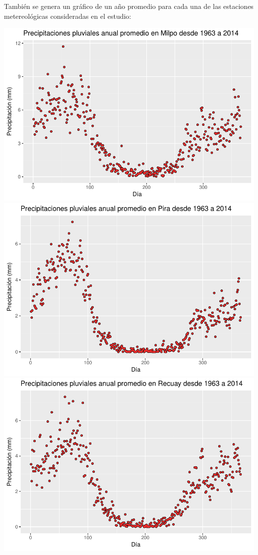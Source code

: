 \documentclass[]{article}
\begin{document}
También se genera un gráfico de un año promedio para cada una de las
estaciones metereológicas consideradas en el estudio:

\includegraphics{proyecto_files/figure-latex/unnamed-chunk-6-1.pdf}
\includegraphics{proyecto_files/figure-latex/unnamed-chunk-6-2.pdf}
\includegraphics{proyecto_files/figure-latex/unnamed-chunk-6-3.pdf}
\end{document}
